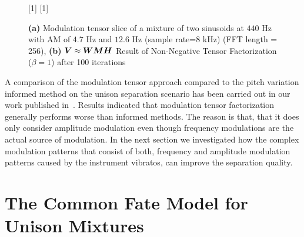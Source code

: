 \begin{figure}[!h]
\centering
[1\textwidth]{}%
\hspace{0.3\textwidth} %
[1\textwidth]{}%
\caption{\textbf{(a)} Modulation tensor slice of a mixture of two sinusoids at $440$ Hz with AM of $4.7$ Hz and $12.6$ Hz (sample rate=$8$ kHz)  (FFT length = 256), \textbf{(b)}  ${\bm{V}} \approx {\bm{W}} {\bm{M}} {\bm{H}}$ Result of Non-Negative Tensor Factorization ($\beta = 1$) after 100 iterations}
\label{fig:am_ntf}
\end{figure}
\par
A comparison of the modulation tensor approach compared to the pitch variation informed method on the unison separation scenario has been carried out in our work published in~\cite{stoeter14}.
Results indicated that modulation tensor factorization generally performs worse than informed methods.
The reason is that, that it does only consider amplitude modulation even though frequency modulations are the actual source of modulation.
In the next section we investigated how the complex modulation patterns that consist of both, frequency and amplitude modulation patterns caused by the instrument vibratos, can improve the separation quality.

\section{The Common Fate Model for Unison Mixtures}%
\label{sec:the_common_fate_model_for_unison_mixtures}


